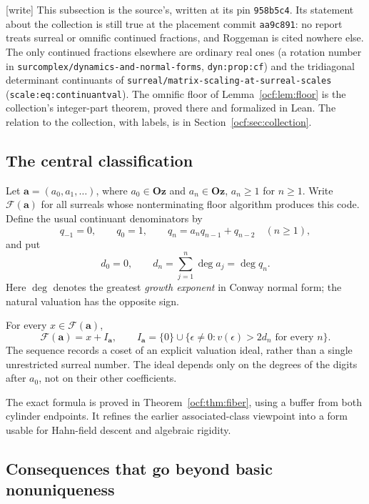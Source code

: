 \documentclass[11pt,a4paper]{article}
\numberwithin{equation}{section}
\theoremstyle{definition}
\theoremstyle{remark}
\newcommand{\Oz}{\mathbf{Oz}}
\newcommand{\F}{\mathcal F}
\newcommand{\dgr}{\operatorname{deg}}
\newcommand{\codea}{\boldsymbol a}
\newcommand{\rpath}[1]{\nolinkurl{#1}}%
\newcommand{\lbl}[1]{\nolinkurl{#1}}%
\newcommand{\wtag}{\textup{[write]}}%
\begin{document}
\wtag{} This subsection is the source's, written at its pin
\texttt{958b5c4}. Its statement about the collection is still true at the
placement commit \texttt{aa9c891}: no report treats surreal or omnific
continued fractions, and Roggeman is cited nowhere else. The only continued
fractions elsewhere are ordinary real ones (a rotation number in
\rpath{surcomplex/dynamics-and-normal-forms}, \lbl{dyn:prop:cf}) and the
tridiagonal determinant continuants of
\rpath{surreal/matrix-scaling-at-surreal-scales}
(\lbl{scale:eq:continuantval}). The omnific floor of
Lemma~\ref{ocf:lem:floor} is the collection's integer-part theorem, proved
there and formalized in Lean. The relation to the collection, with labels,
is in Section~\ref{ocf:sec:collection}.

\subsection{The central classification}

Let $\codea=(a_0,a_1,\ldots)$, where $a_0\in\Oz$ and $a_n\in\Oz$,
$a_n\ge1$ for $n\ge1$. Write $\F(\codea)$ for all surreals whose
nonterminating floor algorithm produces this code. Define the usual
continuant denominators by
\[
 q_{-1}=0,\qquad q_0=1,\qquad
 q_n=a_nq_{n-1}+q_{n-2}\quad(n\ge1),
\]
and put
\begin{equation}\label{ocf:eq:summarydegrees}
 d_0=0,\qquad d_n=\sum_{j=1}^{n}\dgr a_j=\dgr q_n.
\end{equation}
Here $\dgr$ denotes the greatest \emph{growth exponent} in Conway normal
form; the natural valuation has the opposite sign.

\begin{resultbox}
For every $x\in\F(\codea)$,
\[
 \F(\codea)=x+I_{\codea},\qquad
 I_{\codea}=\{0\}\cup
 \{\epsilon\ne0:v(\epsilon)>2d_n\text{ for every }n\}.
\]
The sequence records a coset of an explicit valuation ideal, rather than a
single unrestricted surreal number. The ideal depends only on the degrees
of the digits after $a_0$, not on their other coefficients.
\end{resultbox}

The exact formula is proved in Theorem~\ref{ocf:thm:fiber}, using a buffer from
both cylinder endpoints. It refines the earlier associated-class viewpoint
into a form usable for Hahn-field descent and algebraic rigidity.

\subsection{Consequences that go beyond basic nonuniqueness}
\end{document}
